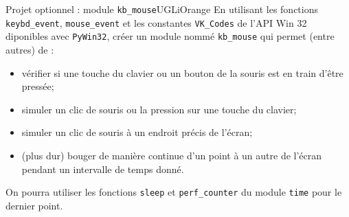 \documentclass[a4paper,10pt,cours]{nsi}
\begin{document}
\begin{encadrecolore}{Projet optionnel : module \texttt{kb\_mouse}}{UGLiOrange}
    En utilisant les fonctions \texttt{keybd\_event}, \texttt{mouse\_event}  et les constantes \texttt{VK\_Codes} de l'API Win 32 diponibles avec \texttt{PyWin32}, créer un module nommé \texttt{kb\_mouse}
    qui permet (entre autres) de :
    \begin{itemize}
        \item 	vérifier si une touche du clavier ou un bouton de la souris est en train d'être pressée;
        \item 	simuler un clic de souris ou la pression sur une touche du clavier;
        \item 	simuler un clic de souris à un endroit précis de l'écran;
        \item	(plus dur) bouger de manière continue d'un point à un autre de l'écran pendant un intervalle de temps donné.
    \end{itemize}
    On pourra utiliser les fonctions \texttt{sleep} et \texttt{perf\_counter} du module \texttt{time} pour le dernier point.
\end{encadrecolore}
\end{document}
